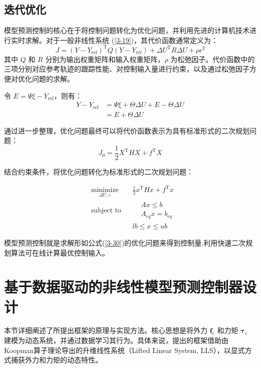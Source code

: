 \documentclass[lang=chs, degree=master, blindreview=false, winfonts=true]{yanputhesis}
\begin{document}
\subsection{迭代优化}
模型预测控制的核心在于将控制问题转化为优化问题，并利用先进的计算机技术进行实时求解。对于一般非线性系统 (\ref{3-19})，其代价函数通常定义为：
\begin{equation}
	J = (Y - Y_\text{ref})^\mathrm{T} Q (Y - Y_\text{ref}) + \Delta U^\mathrm{T} R \Delta U + \rho \epsilon^2
\end{equation}
其中 $Q$ 和 $R$ 分别为输出权重矩阵和输入权重矩阵，$\rho$ 为松弛因子。代价函数中的三项分别对应参考轨迹的跟踪性能、对控制输入量进行约束，以及通过松弛因子方便对优化问题的求解。

令 $E = \Psi \xi - Y_{\text{ref}}$，则有：
\begin{equation}
	\begin{aligned}
		Y - Y_{\text{ref}} &= \Psi \xi + \Theta \Delta U + E - \Theta \Delta U 
		\\&= E + \Theta \Delta U
	\end{aligned}
\end{equation}

通过进一步整理，优化问题最终可以将代价函数表示为具有标准形式的二次规划问题：
\begin{equation}
	J_0 = \frac{1}{2} X^\mathrm{T} H X + f^\mathrm{T} X
\end{equation}

结合约束条件，将优化问题转化为标准形式的二次规划问题：

\begin{equation}
\begin{aligned}
	&\operatorname*{minimize}_{\Delta U,\varepsilon}&& \frac{1}{2}x^{\mathrm{T}}Hx+f^{\mathrm{T}}x  \\
	&\text{subject to}&& \begin{aligned}&Ax\leq b\\
		&A_{eq}x=b_{eq}\end{aligned}  \\
	&&&lb\leq x\leq ub\
\end{aligned}
\label{3-30}
\end{equation}

模型预测控制就是求解形如公式(\ref{3-30})的优化问题来得到控制量,利用快速二次规划算法可在线计算最优控制输入。




\section{基于数据驱动的非线性模型预测控制器设计}
本节详细阐述了所提出框架的原理与实现方法。核心思想是将外力 $\bm{f}_e$ 和力矩 $\bm{\tau}_e$ 建模为动态系统，并通过数据学习其行为。具体来说，提出的框架借助由Koopman算子理论导出的升维线性系统（Lifted Linear System, LLS），以显式方式捕获外力和力矩的动态特性。
\end{document}
